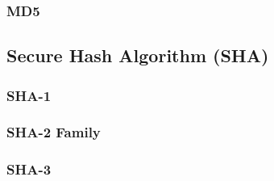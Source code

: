\subsubsection{MD5}

\subsection{Secure Hash Algorithm (SHA)}

\subsubsection{SHA-1}

\subsubsection{SHA-2 Family}

\subsubsection{SHA-3}

